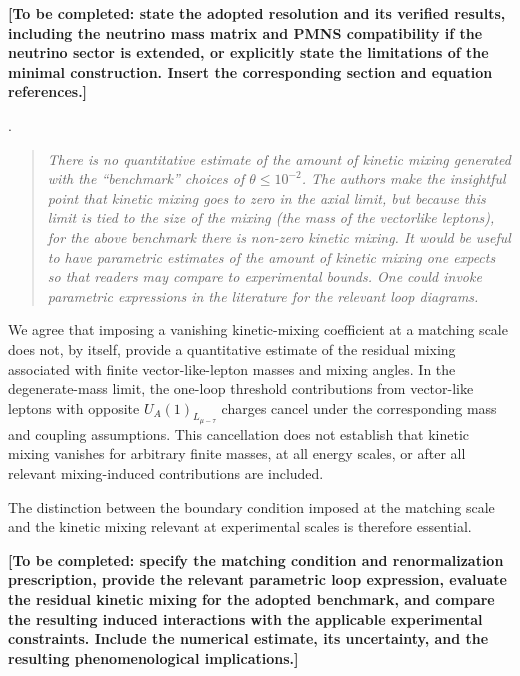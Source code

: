 \documentclass[12pt,a4paper]{article}
\begin{document}
\textbf{[To be completed: state the adopted resolution and its verified results, including the neutrino mass matrix and PMNS compatibility if the neutrino sector is extended, or explicitly state the limitations of the minimal construction. Insert the corresponding section and equation references.]}

\medskip
{}.
\begin{quote}\itshape
There is no quantitative estimate of the amount of kinetic mixing generated with the ``benchmark'' choices of \(\theta\leq10^{-2}\). The authors make the insightful point that kinetic mixing goes to zero in the axial limit, but because this limit is tied to the size of the mixing (the mass of the vectorlike leptons), for the above benchmark there is non-zero kinetic mixing. It would be useful to have parametric estimates of the amount of kinetic mixing one expects so that readers may compare to experimental bounds. One could invoke parametric expressions in the literature for the relevant loop diagrams.
\end{quote}


We agree that imposing a vanishing kinetic-mixing coefficient at a matching scale does not, by itself, provide a quantitative estimate of the residual mixing associated with finite vector-like-lepton masses and mixing angles. In the degenerate-mass limit, the one-loop threshold contributions from vector-like leptons with opposite \(U_A(1)_{L_{\mu-\tau}}\) charges cancel under the corresponding mass and coupling assumptions. This cancellation does not establish that kinetic mixing vanishes for arbitrary finite masses, at all energy scales, or after all relevant mixing-induced contributions are included.

The distinction between the boundary condition imposed at the matching scale and the kinetic mixing relevant at experimental scales is therefore essential.

\textbf{[To be completed: specify the matching condition and renormalization prescription, provide the relevant parametric loop expression, evaluate the residual kinetic mixing for the adopted benchmark, and compare the resulting induced interactions with the applicable experimental constraints. Include the numerical estimate, its uncertainty, and the resulting phenomenological implications.]}
\end{document}

